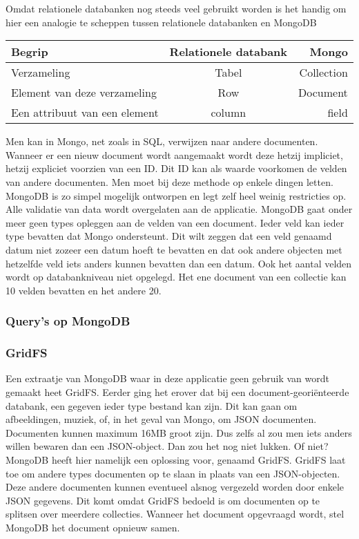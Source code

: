 \documentclass[a4paper,11pt]{article}
\newcommand{\head}[1]{\textnormal{\textbf{#1}}}
\begin{document}
Omdat relationele databanken nog steeds veel gebruikt worden is het handig om hier een analogie te scheppen tussen relationele databanken en MongoDB

\begin{tabular}{lcr}
\hline
\head{Begrip} & \head{Relationele databank} & \head{Mongo} \\
\hline
Verzameling & Tabel & Collection \\
Element van deze verzameling & Row & Document \\
Een attribuut van een element & column & field

\end{tabular}

Men kan in Mongo, net zoals in SQL, verwijzen naar andere documenten. Wanneer er een nieuw document wordt aangemaakt wordt deze hetzij impliciet, hetzij expliciet voorzien van een ID. Dit ID kan als waarde voorkomen de velden van andere documenten. Men moet bij deze methode op enkele dingen letten. MongoDB is zo simpel mogelijk ontworpen en legt zelf heel weinig restricties op. Alle validatie van data wordt overgelaten aan de applicatie. MongoDB gaat onder meer geen types opleggen aan de velden van een document. Ieder veld kan ieder type bevatten dat Mongo ondersteunt. Dit wilt zeggen dat een veld genaamd datum niet zozeer een datum hoeft te bevatten en dat ook andere objecten met hetzelfde veld iets anders kunnen bevatten dan een datum. Ook het aantal velden wordt op databankniveau niet opgelegd. Het ene document van een collectie kan 10 velden bevatten en het andere 20.

\subsubsection{Query's op MongoDB}

\subsubsection{GridFS}
Een extraatje van MongoDB waar in deze applicatie geen gebruik van wordt gemaakt heet GridFS. Eerder ging het erover dat bij een document-georiënteerde databank, een gegeven ieder type bestand kan zijn. Dit kan gaan om afbeeldingen, muziek, of, in het geval van Mongo, om JSON documenten. Documenten kunnen maximum 16MB groot zijn. Dus zelfs al zou men iets anders willen bewaren dan een JSON-object. Dan zou het nog niet lukken. Of niet? MongoDB heeft hier namelijk een oplossing voor, genaamd GridFS. GridFS laat toe om andere types documenten op te slaan in plaats van een JSON-objecten. Deze andere documenten kunnen eventueel alsnog vergezeld worden door enkele JSON gegevens. Dit komt omdat GridFS bedoeld is om documenten op te splitsen over meerdere collecties. Wanneer het document opgevraagd wordt, stel MongoDB het document opnieuw samen.
\end{document}
